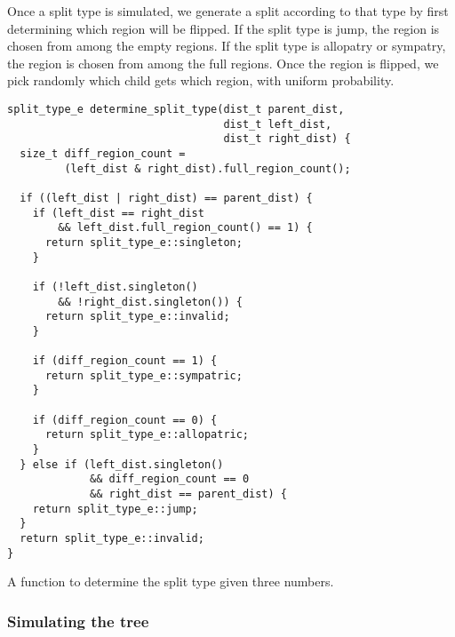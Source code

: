 \documentclass{article}
\begin{document}

Once a split type is simulated, we generate
a split according to that type by first determining which region will be
flipped\footnotemark.
If the split type is jump, the region is chosen from among the empty regions.
If the split type is allopatry or sympatry, the region is chosen from among the
full regions.
Once the region is flipped, we pick randomly which child gets which region,
with uniform probability.


\begin{listing}
	\begin{verbatim}
split_type_e determine_split_type(dist_t parent_dist, 
                                  dist_t left_dist, 
                                  dist_t right_dist) {
  size_t diff_region_count =
         (left_dist & right_dist).full_region_count();

  if ((left_dist | right_dist) == parent_dist) {
    if (left_dist == right_dist 
        && left_dist.full_region_count() == 1) {
      return split_type_e::singleton;
    }

    if (!left_dist.singleton() 
        && !right_dist.singleton()) {
      return split_type_e::invalid;
    }

    if (diff_region_count == 1) {
      return split_type_e::sympatric;
    }

    if (diff_region_count == 0) {
      return split_type_e::allopatric;
    }
  } else if (left_dist.singleton()
             && diff_region_count == 0
             && right_dist == parent_dist) {
    return split_type_e::jump;
  }
  return split_type_e::invalid;
}
\end{verbatim}
	\caption{A function to determine the split type given three numbers.}
	\label{lst:determine-split-type}
\end{listing}

\subsubsection{Simulating the tree}
\end{document}

